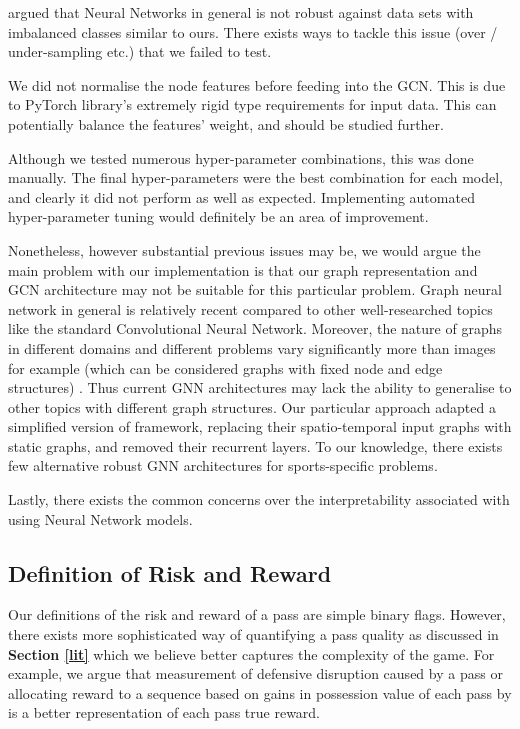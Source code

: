 \documentclass[conference]{IEEEtran}
\begin{document}
\textcite{Buda_2018} argued that Neural Networks in general is not robust against data sets with imbalanced classes similar to ours. There exists ways to tackle this issue (over / under-sampling etc.) that we failed to test.

We did not normalise the node features before feeding into the GCN. This is due to PyTorch library's extremely rigid type requirements for input data. This can potentially balance the features' weight, and should be studied further.

Although we tested numerous hyper-parameter combinations, this was done manually. The final hyper-parameters were the best combination for each model, and clearly it did not perform as well as expected. Implementing automated hyper-parameter tuning would definitely be an area of improvement.

Nonetheless, however substantial previous issues may be, we would argue the main problem with our implementation is that our graph representation and GCN architecture may not be suitable for this particular problem. Graph neural network in general is relatively recent compared to other well-researched topics like the standard Convolutional Neural Network. Moreover, the nature of graphs in different domains and different problems vary significantly more than images for example (which can be considered graphs with fixed node and edge structures) \parencite{gnnbias}. Thus current GNN architectures may lack the ability to generalise to other topics with different graph structures. Our particular approach adapted a simplified version of \textcite{gnn_framework} framework, replacing their spatio-temporal input graphs with static graphs, and removed their recurrent layers. To our knowledge, there exists few alternative robust GNN architectures for sports-specific problems.

Lastly, there exists the common concerns over the interpretability associated with using Neural Network models.


\subsection{Definition of Risk and Reward}

Our definitions of the risk and reward of a pass are simple binary flags. However, there exists more sophisticated way of quantifying a pass quality as discussed in \textbf{Section \ref{lit}} which we believe better captures the complexity of the game. For example, we argue that \textcite{goespassassist} measurement of defensive disruption caused by a pass or allocating reward to a sequence based on gains in possession value of each pass by \textcite{qpass} is a better representation of each pass true reward.
\end{document}
